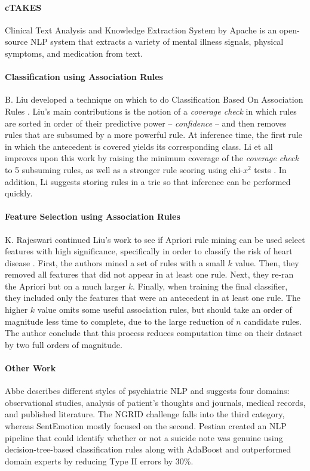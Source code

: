 \paragraph{cTAKES} Clinical Text Analysis and Knowledge Extraction System \cite{ctakes} by Apache is an open-source NLP system that extracts a variety of mental illness signals, physical symptoms, and medication from text.

\paragraph{Classification using Association Rules} B. Liu developed a technique on which to do Classification Based On Association Rules \cite{cba}. Liu's main contributions is the notion of a \textit{coverage check} in which rules are sorted in order of their predictive power -- \textit{confidence} -- and then removes rules that are subsumed by a more powerful rule. At inference time, the first rule in which the antecedent is covered yields its corresponding class. Li et all improves upon this work by raising the minimum coverage of the \textit{coverage check} to 5 subsuming rules, as well as a stronger rule scoring using chi-$x^2$ tests \cite{cmar}. In addition, Li suggests storing rules in a trie so that inference can be performed quickly. 

\paragraph{Feature Selection using Association Rules} K. Rajeswari continued Liu's work to see if \textsf{Apriori} rule mining can be used select features with high significance, specifically in order to classify the risk of heart disease \cite{rajeswari}. First, the authors mined a set of rules with a small $k$ value. Then, they removed all features that did not appear in at least one rule. Next, they re-ran the \textsf{Apriori} but on a much larger $k$. Finally, when training the final classifier, they included only the features that were an antecedent in at least one rule. The higher $k$ value omits some useful association rules, but should take an order of magnitude less time to complete, due to the large reduction of $n$ candidate rules. The author conclude that this process reduces computation time on their dataset by two full orders of magnitude.

\paragraph{Other Work} Abbe \cite{abbe} describes different styles of psychiatric NLP and suggests four domains: observational studies, analysis of patient's thoughts and journals, medical records, and published literature. The NGRID challenge falls into the third category, whereas SentEmotion mostly focused on the second. Pestian \cite{pestian} created an NLP pipeline that could identify whether or not a suicide note was genuine using decision-tree-based classification rules along with AdaBoost and outperformed domain experts by reducing Type II errors by 30\%.

